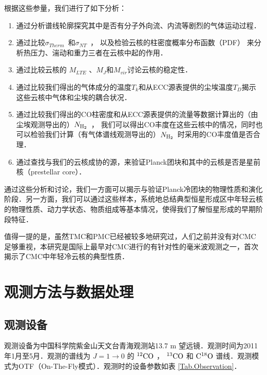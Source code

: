 \documentclass[UTF8, nocolorlinks]{pkuthss}
\newcommand{\coa}{$\rm ^{12}CO$ }
\newcommand{\cob}{$\rm ^{13}CO$ }
\newcommand{\coc}{$\rm C^{18}O$ }
\newcommand{\nhyd}{$N_{\rm H_2}$\ }
\newcommand{\sigmath}{$\sigma _{Therm}$\ }
\newcommand{\sigmant}{$\sigma _{NT}$\ }
\begin{document}
		根据这些参量，我们进行了如下分析：

		\begin{enumerate}
			\item 通过分析谱线轮廓探究其中是否有分子外向流、内流等剧烈的气体运动过程．

			\item 通过比较\sigmath 和\sigmant ， 以及检验云核的柱密度概率分布函数（PDF） 来分析热压力、湍动和重力三者在云核中起的作用．

			\item 通过比较云核的 $M_{LTE}$ 、$M_{J}$和$M_{vir}$讨论云核的稳定性．

			\item 通过比较我们得出的气体成分的温度$T_k$和从ECC源表提供的尘埃温度$T_D$揭示这些云核中气体和尘埃的耦合状况．

			\item 通过比较我们得出的CO柱密度和从ECC源表提供的流量等数据计算出的（由尘埃观测导出的）\nhyd， 我们可以得出CO丰度在这些云核中的情况，同时也可以检验我们计算（有气体谱线观测导出的）\nhyd 时采用的CO丰度值是否合理．

			\item 通过查找与我们的云核成协的源，来验证Planck团块和其中的云核是否是星前核（prestellar core）．
		\end{enumerate}

		通过这些分析和讨论，我们一方面可以揭示与验证Planck冷团块的物理性质和演化阶段．另一方面，我们可以通过这些样本，系统地总结典型恒星形成区中年轻云核的物理性质、动力学状态、物质组成等基本情况，使得我们了解恒星形成的早期阶段特征．

		值得一提的是，虽然TMC和PMC已经被较多地研究过，人们之前并没有对CMC足够重视，本研究是国际上最早对CMC进行的有针对性的毫米波观测之一，首次揭示了CMC中年轻冷云核的典型性质．

\chapter{观测方法与数据处理}

	\section{观测设备}
		观测设备为中国科学院紫金山天文台青海观测站13.7 m 望远镜．观测时间为2011年1月至5月．观测的谱线为 $J=1 \rightarrow 0 $ 的  \coa， \cob 和 \coc 谱线．观测模式为OTF（On-The-Fly模式）．观测时的设备参数如表 \ref{Tab.Observation}．
\end{document}
